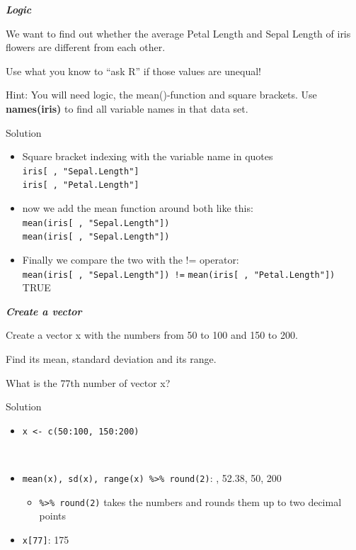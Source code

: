 \documentclass[
]{book}
\providecommand{\tightlist}{%
  \setlength{\itemsep}{0pt}\setlength{\parskip}{0pt}}
\begin{document}
\textbf{\emph{Logic}}

We want to find out whether the average Petal Length and Sepal Length of iris flowers are different from each other.

Use what you know to ``ask R'' if those values are unequal!

Hint: You will need logic, the mean()-function and square brackets. Use \textbf{names(iris)} to find all variable names in that data set.

Solution

\begin{itemize}
\tightlist
\item
  Square bracket indexing with the variable name in quotes \newline
  \texttt{iris{[}\ ,\ "Sepal.Length"{]}}\\
  \texttt{iris{[}\ ,\ "Petal.Length"{]}}
\item
  now we add the mean function around both like this:
  \texttt{mean(iris{[}\ ,\ "Sepal.Length"{]})}\\
  \texttt{mean(iris{[}\ ,\ "Sepal.Length"{]})}
\item
  Finally we compare the two with the != operator:
  \texttt{mean(iris{[}\ ,\ "Sepal.Length"{]})\ !=}
  \texttt{mean(iris{[}\ ,\ "Petal.Length"{]})}\\
  TRUE
\end{itemize}

\textbf{\emph{Create a vector}}

Create a vector x with the numbers from 50 to 100 and 150 to 200.

Find its mean, standard deviation and its range.

What is the 77th number of vector x?

Solution

\begin{itemize}
\tightlist
\item
  \texttt{x\ \textless{}-\ c(50:100,\ 150:200)}\strut \\
\item
  \texttt{mean(x),\ sd(x),\ range(x)\ \%\textgreater{}\%\ round(2)}: , 52.38, 50, 200

  \begin{itemize}
  \tightlist
  \item
    \texttt{\%\textgreater{}\%\ round(2)} takes the numbers and rounds them up to two decimal points
  \end{itemize}
\item
  \texttt{x{[}77{]}}: 175
\end{itemize}
\end{document}
